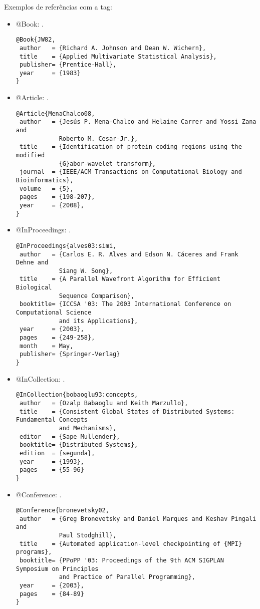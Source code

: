 Exemplos de referências com a tag:
\begin{itemize}
\item @Book: \cite{JW82}.
{\scriptsize\begin{verbatim}
@Book{JW82,
 author   = {Richard A. Johnson and Dean W. Wichern},
 title    = {Applied Multivariate Statistical Analysis},
 publisher= {Prentice-Hall},
 year     = {1983}
}
\end{verbatim}}

\item @Article: \cite{MenaChalco08}.
{\scriptsize\begin{verbatim}
@Article{MenaChalco08,
 author   = {Jesús P. Mena-Chalco and Helaine Carrer and Yossi Zana and 
            Roberto M. Cesar-Jr.},
 title    = {Identification of protein coding regions using the modified 
            {G}abor-wavelet transform},
 journal  = {IEEE/ACM Transactions on Computational Biology and Bioinformatics},
 volume   = {5},
 pages    = {198-207},
 year     = {2008},
}
\end{verbatim}}

\item @InProceedings: \cite{alves03:simi}.
{\scriptsize\begin{verbatim}
@InProceedings{alves03:simi,
 author   = {Carlos E. R. Alves and Edson N. Cáceres and Frank Dehne and 
            Siang W. Song},
 title    = {A Parallel Wavefront Algorithm for Efficient Biological 
            Sequence Comparison},
 booktitle= {ICCSA '03: The 2003 International Conference on Computational Science
            and its Applications},
 year     = {2003},
 pages    = {249-258},
 month    = May,
 publisher= {Springer-Verlag}
}
\end{verbatim}}

\item @InCollection: \cite{bobaoglu93:concepts}.
{\scriptsize\begin{verbatim}
@InCollection{bobaoglu93:concepts,
 author   = {Ozalp Babaoglu and Keith Marzullo},
 title    = {Consistent Global States of Distributed Systems: Fundamental Concepts
            and Mechanisms},
 editor   = {Sape Mullender},
 booktitle= {Distributed Systems},
 edition  = {segunda},
 year     = {1993},
 pages    = {55-96}
}
\end{verbatim}}

\item @Conference: \cite{bronevetsky02}.
{\scriptsize\begin{verbatim}
@Conference{bronevetsky02,
 author   = {Greg Bronevetsky and Daniel Marques and Keshav Pingali and 
            Paul Stodghill},
 title    = {Automated application-level checkpointing of {MPI} programs},
 booktitle= {PPoPP '03: Proceedings of the 9th ACM SIGPLAN Symposium on Principles
            and Practice of Parallel Programming},
 year     = {2003},
 pages    = {84-89}
}
\end{verbatim}}


\end{itemize}
